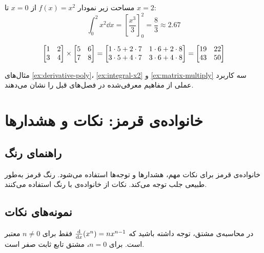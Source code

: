 \documentclass{matinbook}
\begin{document}
\begin{example}
    مساحت زیر نمودار $f(x) = x^{2}$ از $x = 0$ تا $x = 2$:
    \[
        \int_{0}^{2} x^{2} \dd{x}
        = \left[ \frac{x^{3}}{3} \right]_{0}^{2}
        = \frac{8}{3} \approx 2.67
    \]
    \label{ex:integral-x2}
\end{example}

\begin{example}
    \[
    \begin{bmatrix}1 & 2 \\ 3 & 4\end{bmatrix} \times
    \begin{bmatrix}5 & 6 \\ 7 & 8\end{bmatrix} =
    \begin{bmatrix}1\cdot5+2\cdot7 & 1\cdot6+2\cdot8 \\
         3\cdot5+4\cdot7 & 3\cdot6+4\cdot8\end{bmatrix} =
    \begin{bmatrix}19 & 22 \\ 43 & 50\end{bmatrix}
    \]
    \label{ex:matrix-multiply}
\end{example}

مثال‌های \cref{ex:derivative-poly}، \cref{ex:integral-x2}
و \cref{ex:matrix-multiply} سه کاربرد عملی از مفاهیم
معرفی‌شده در فصل‌های قبل را نشان می‌دهند.

\chapter{خانواده‌ی قرمز: نکات و هشدارها}
\label{chap:family-red}

\section{راهنمای رنگ}
\label{sec:family-red-guide}

خانواده‌ی قرمز برای نکات مهم، هشدارها و توجه‌ها استفاده
می‌شود. رنگ قرمز به‌طور طبیعی جلب توجه می‌کند. نکات
از خانواده‌ی  با رنگ 
استفاده می‌کنند.


\section{نمونه‌های نکات}
\label{sec:family-red-samples}

\begin{remark}
    در محاسبه‌ی مشتق، توجه داشته باشید که
    $\frac{\mathrm{d}}{\mathrm{d}x}(x^{n}) = nx^{n-1}$ فقط برای $n \neq 0$
    معتبر است. برای $n = 0$، مشتق تابع ثابت صفر است.
    \label{rem:derivative-power}
\end{remark}
\end{document}
